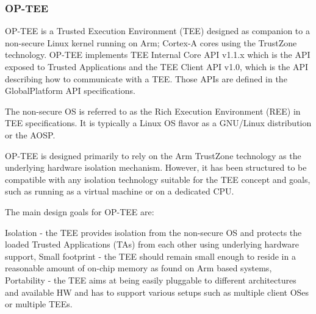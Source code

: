 \subsubsection{OP-TEE}

OP-TEE is a Trusted Execution Environment (TEE) designed as companion to a non-secure Linux kernel running on Arm; Cortex-A cores using the TrustZone technology. OP-TEE implements TEE Internal Core API v1.1.x which is the API exposed to Trusted Applications and the TEE Client API v1.0, which is the API describing how to communicate with a TEE. Those APIs are defined in the GlobalPlatform API specifications.

The non-secure OS is referred to as the Rich Execution Environment (REE) in TEE specifications. It is typically a Linux OS flavor as a GNU/Linux distribution or the AOSP.

OP-TEE is designed primarily to rely on the Arm TrustZone technology as the underlying hardware isolation mechanism. However, it has been structured to be compatible with any isolation technology suitable for the TEE concept and goals, such as running as a virtual machine or on a dedicated CPU.

The main design goals for OP-TEE are:

Isolation - the TEE provides isolation from the non-secure OS and protects the loaded Trusted Applications (TAs) from each other using underlying hardware support,
Small footprint - the TEE should remain small enough to reside in a reasonable amount of on-chip memory as found on Arm based systems,
Portability - the TEE aims at being easily pluggable to different architectures and available HW and has to support various setups such as multiple client OSes or multiple TEEs.